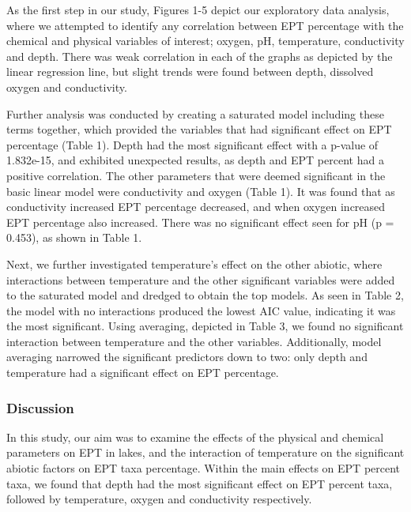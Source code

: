 \documentclass[]{article}
\begin{document}
As the first step in our study, Figures 1-5 depict our exploratory data
analysis, where we attempted to identify any correlation between EPT
percentage with the chemical and physical variables of interest; oxygen,
pH, temperature, conductivity and depth. There was weak correlation in
each of the graphs as depicted by the linear regression line, but slight
trends were found between depth, dissolved oxygen and conductivity.

Further analysis was conducted by creating a saturated model including
these terms together, which provided the variables that had significant
effect on EPT percentage (Table 1). Depth had the most significant
effect with a p-value of 1.832e-15, and exhibited unexpected results, as
depth and EPT percent had a positive correlation. The other parameters
that were deemed significant in the basic linear model were conductivity
and oxygen (Table 1). It was found that as conductivity increased EPT
percentage decreased, and when oxygen increased EPT percentage also
increased. There was no significant effect seen for pH (p = 0.453), as
shown in Table 1.

Next, we further investigated temperature's effect on the other
abiotic, where interactions between temperature and the other
significant variables were added to the saturated model and dredged to
obtain the top models. As seen in Table 2, the model with no
interactions produced the lowest AIC value, indicating it was the most
significant. Using averaging, depicted in Table 3, we found no
significant interaction between temperature and the other variables.
Additionally, model averaging narrowed the significant predictors down
to two: only depth and temperature had a significant effect on EPT
percentage.

\subsubsection{Discussion}\label{discussion}

In this study, our aim was to examine the effects of the physical and
chemical parameters on EPT in lakes, and the interaction of temperature
on the significant abiotic factors on EPT taxa percentage. Within the
main effects on EPT percent taxa, we found that depth had the most
significant effect on EPT percent taxa, followed by temperature, oxygen
and conductivity respectively.
\end{document}
